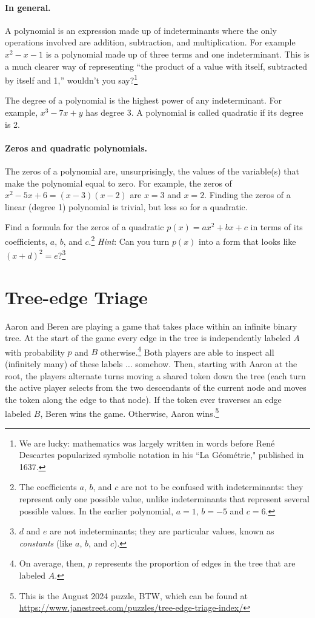 \documentclass{book}
\begin{document}
\subsubsection*{In general.}
A polynomial is an expression made up of indeterminants where the only operations involved are addition, subtraction, and multiplication. For example $x^2 - x - 1$ is a polynomial made up of three terms and one indeterminant. This is a much clearer way of representing ``the product of a value with itself, subtracted by itself and 1,'' wouldn't you say?\footnote{We are lucky: mathematics was largely written in words before Ren\'e Descartes popularized symbolic notation in his ``La G\'eom\'etrie," published in 1637.}

The degree of a polynomial is the highest power of any indeterminant. For example, $x^3 - 7x + y$ has degree 3. A polynomial is called quadratic if its degree is 2.

\subsubsection*{Zeros and quadratic polynomials.}
The zeros of a polynomial are, unsurprisingly, the values of the variable(s) that make the polynomial equal to zero. For example, the zeros of $x^2 - 5x + 6 = (x-3)(x-2)$ are $x = 3$ and $x = 2$. Finding the zeros of a linear (degree 1) polynomial is trivial, but less so for a quadratic.

\begin{exercise}\label{completesquare}
Find a formula for the zeros of a quadratic $p(x) = ax^2 + bx + c$ in terms of its coefficients, $a$, $b$, and $c$.\footnote{The coefficients $a$, $b$, and $c$ are not to be confused with indeterminants: they represent only one possible value, unlike indeterminants that represent several possible values. In the earlier polynomial, $a = 1$, $b = -5$ and $c = 6$.} \emph{Hint}: Can you turn $p(x)$ into a form that looks like $(x + d)^2 = e$?\footnote{$d$ and $e$ are not indeterminants; they are particular values, known as \emph{constants}  (like $a$, $b$, and $c$).}
\end{exercise}
\chapter{Tree-edge Triage}\label{statement}
Aaron and Beren are playing a game that takes place within an infinite binary tree. At the start of the game every edge in the tree is independently labeled $A$ with probability $p$  and $B$ otherwise.\footnote{On average, then, $p$ represents the proportion of edges in the tree that are labeled $A$.} Both players are able to inspect all (infinitely many) of these labels $\ldots$ somehow. Then, starting with Aaron at the root, the players alternate turns moving a shared token down the tree (each turn the active player selects from the two descendants of the current node and moves the token along the edge to that node). If the token ever traverses an edge labeled $B$, Beren wins the game. Otherwise, Aaron wins.\footnote{This is the August 2024 puzzle, BTW, which can be found at \url{https://www.janestreet.com/puzzles/tree-edge-triage-index/}}
\end{document}
